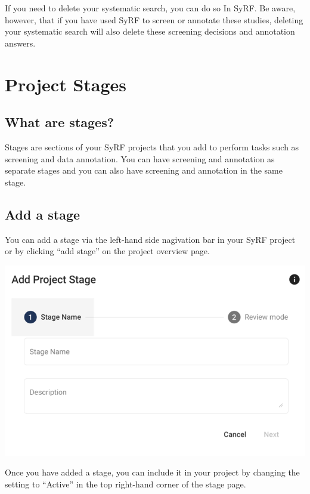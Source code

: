 \documentclass[
]{book}
\begin{document}
If you need to delete your systematic search, you can do so In SyRF. Be aware, however, that if you have used SyRF to screen or annotate these studies, deleting your systematic search will also delete these screening decisions and annotation answers.

\hypertarget{projectstages}{%
\chapter{Project Stages}\label{projectstages}}

\hypertarget{what-are-stages}{%
\section{What are stages?}\label{what-are-stages}}

Stages are sections of your SyRF projects that you add to perform tasks such as screening and data annotation. You can have screening and annotation as separate stages and you can also have screening and annotation in the same stage.

\hypertarget{add-a-stage}{%
\section{Add a stage}\label{add-a-stage}}

You can add a stage via the left-hand side nagivation bar in your SyRF project or by clicking ``add stage'' on the project overview page.

\includegraphics[width=9.88in]{figs/Fig_Add_stage}

Once you have added a stage, you can include it in your project by changing the setting to ``Active'' in the top right-hand corner of the stage page.
\end{document}
